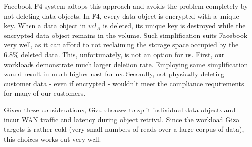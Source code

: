 Facebook F4 system adtops this approach and avoids the problem completely by not deleting data objects. In F4, every data object is encrypted with a unique key. When a data object in $vol_A$ is deleted, its unique key is destroyed while the encrypted data object remains in the volume. Such simplification suits Facebook very well, as it can afford to not reclaiming the storage space occupied by the  $6.8\%$ deleted data. This, unfortunately, is not an option for us. First, our workloads demonstrate much larger deletion rate. Employing same simplification would result in much higher cost for us. Secondly, not physically deleting customer data - even if encrypted - wouldn't meet the compliance requirements for many of our customers.

Given these considerations, Giza chooses to split individual data objects and incur WAN traffic and latency during object retrival. Since the workload Giza targets is rather cold (very small numbers of reads over a large corpus of data), this choices works out very well.